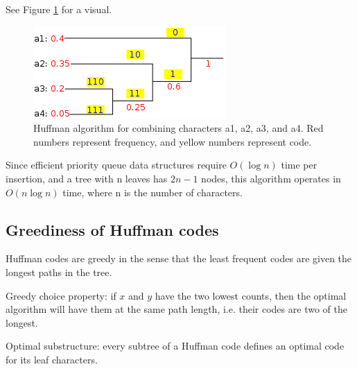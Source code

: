 \documentclass{article}
\begin{document}
See Figure \ref{huffman} for a visual.

\begin{figure}
\centering
\includegraphics[scale=0.7]{img/huffman.png}
\caption{Huffman algorithm for combining characters a1, a2, a3, and a4.  Red numbers represent frequency, and yellow numbers represent code. \label{huffman}}
\end{figure}
Since efficient priority queue data structures require $O(\log n)$ time per insertion, and a tree with n leaves has $2n-1$ nodes, this algorithm operates in $O(n \log n)$ time, where n is the number of characters.

\subsection{Greediness of Huffman codes}
Huffman codes are greedy in the sense that the least frequent codes are given the longest paths in the tree.

Greedy choice property: if $x$ and $y$ have the two lowest counts, then the optimal algorithm will have them at the same path length, i.e. their codes are two of the longest.

Optimal substructure: every subtree of a Huffman code defines an optimal code for its leaf characters.
\end{document}
